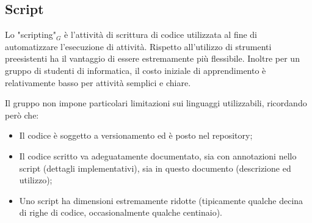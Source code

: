 \subsection{Script}
Lo "scripting"$_G$ è l'attività di scrittura di codice utilizzata al fine di automatizzare l'esecuzione di attività. Rispetto all'utilizzo di strumenti preesistenti ha il vantaggio di essere estremamente più flessibile. Inoltre per un gruppo di studenti di informatica, il costo iniziale di apprendimento è relativamente basso per attività semplici e chiare.

Il gruppo non impone particolari limitazioni sui linguaggi utilizzabili, ricordando però che:
\begin{itemize}
    \item Il codice è soggetto a versionamento ed è posto nel repository;
    \item Il codice scritto va adeguatamente documentato, sia con annotazioni nello script (dettagli implementativi), sia in questo documento (descrizione ed utilizzo);
    \item Uno script ha dimensioni estremamente ridotte (tipicamente qualche decina di righe di codice, occasionalmente qualche centinaio).
\end{itemize}


